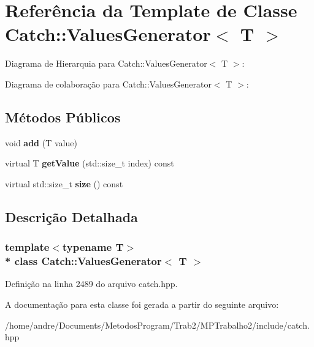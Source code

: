 \hypertarget{classCatch_1_1ValuesGenerator}{}\section{Referência da Template de Classe Catch\+:\+:Values\+Generator$<$ T $>$}
\label{classCatch_1_1ValuesGenerator}


Diagrama de Hierarquia para Catch\+:\+:Values\+Generator$<$ T $>$\+:


Diagrama de colaboração para Catch\+:\+:Values\+Generator$<$ T $>$\+:
\subsection*{Métodos Públicos}
\begin{DoxyCompactItemize}
\item 
void {\bfseries add} (T value)\hypertarget{classCatch_1_1ValuesGenerator_a8412c8ce5d9d4fc6ff06d5246d56d538}{}\label{classCatch_1_1ValuesGenerator_a8412c8ce5d9d4fc6ff06d5246d56d538}

\item 
virtual T {\bfseries get\+Value} (std\+::size\+\_\+t index) const \hypertarget{classCatch_1_1ValuesGenerator_a60599dd67096ff108471f64ee42acd9d}{}\label{classCatch_1_1ValuesGenerator_a60599dd67096ff108471f64ee42acd9d}

\item 
virtual std\+::size\+\_\+t {\bfseries size} () const \hypertarget{classCatch_1_1ValuesGenerator_a98a80bb0dd682c44e82e4a75e98c4682}{}\label{classCatch_1_1ValuesGenerator_a98a80bb0dd682c44e82e4a75e98c4682}

\end{DoxyCompactItemize}


\subsection{Descrição Detalhada}
\subsubsection*{template$<$typename T$>$\\*
class Catch\+::\+Values\+Generator$<$ T $>$}



Definição na linha 2489 do arquivo catch.\+hpp.



A documentação para esta classe foi gerada a partir do seguinte arquivo\+:\begin{DoxyCompactItemize}
\item 
/home/andre/\+Documents/\+Metodos\+Program/\+Trab2/\+M\+P\+Trabalho2/include/catch.\+hpp\end{DoxyCompactItemize}
